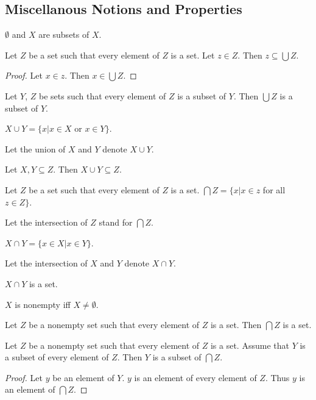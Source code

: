 \documentclass[english,11pt]{article}
\begin{document}
\subsection{Miscellanous Notions and Properties}
\begin{forthel}

\begin{lemma} $\emptyset$ and $X$  are subsets of  $X$. \end{lemma}

\begin{lemma} Let $Z$ be a set such that every element of $Z$ is a set.
Let $z \in Z$. Then $z \subseteq \bigcup Z$.
\end{lemma}
\begin{proof}
Let $x \in z$. Then $x \in \bigcup Z$.
\end{proof}

\begin{lemma} Let $Y$, $Z$ be sets such that every element of $Z$ 
is a subset of $Y$. Then $\bigcup Z$ is a subset of $Y$.
\end{lemma}

\begin{definition}
$X \cup Y = \{x | x \in X$ or $x \in Y\}$. 
\end{definition}
Let the union of $X$ and $Y$ denote $X \cup Y$.

\begin{lemma}
Let $X,Y \subseteq Z$. Then $X \cup Y \subseteq Z$.
\end{lemma}

\begin{definition} Let $Z$ be a set such that every element of $Z$ is a set.
$\bigcap Z = \{x | x \in z$ for all $z \in Z\}$.
\end{definition}
Let the intersection of $Z$ stand for $\bigcap Z$. 

\begin{definition} $X \cap Y = \{x \in X | x \in Y\}$. \end{definition}
Let the intersection of $X$ and $Y$ denote $X \cap Y$. 

\begin{lemma} $X \cap Y$ is a set. \end{lemma}

\begin{definition} $X$ is nonempty iff $X \neq \emptyset$.
\end{definition}

\begin{lemma} Let $Z$ be a nonempty set such that every element of $Z$ is a set.
Then $\bigcap Z$ is a set.
\end{lemma}

\begin{lemma} Let $Z$ be a nonempty set such that every element of $Z$
is a set. Assume that $Y$ is a subset
of every element of $Z$. Then $Y$ is a subset of $\bigcap Z$.
\end{lemma}
\begin{proof}
Let $y$ be an element of $Y$.
$y$ is an element of every element of $Z$.
Thus $y$ is an element of $\bigcap Z$.
\end{proof}
\end{forthel}
\end{document}
